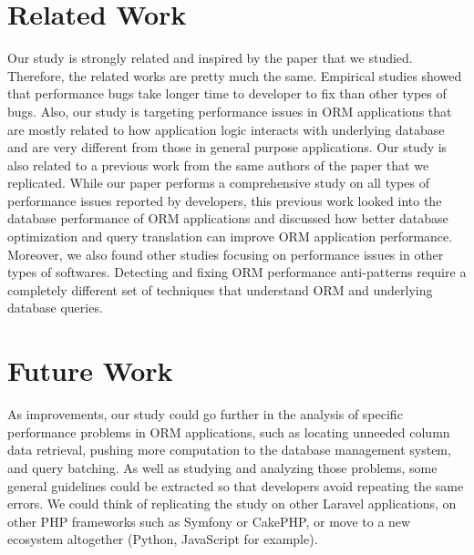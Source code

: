 \documentclass[sigconf]{acmart}
\begin{document}
\section{Related Work}
Our study is strongly related and inspired by the paper \cite{paper} that we studied. Therefore, the related works are pretty much the same. Empirical studies showed that performance bugs take longer time to developer to fix than other types of bugs. Also, our study is targeting performance issues in ORM applications that are mostly related to how application logic interacts with underlying database and are very different from those in general purpose applications. Our study is also related to a previous work \cite{paperInefficiencies} from the same authors of the paper that we replicated. While our paper performs a comprehensive study on all types of performance issues reported by developers, this previous work looked into the database performance of ORM applications and discussed how better database optimization and query translation can improve ORM application performance. Moreover, we also found other studies \cite{paperTechniques,paperBugs} focusing on performance issues in other types of softwares. Detecting and fixing ORM performance anti-patterns require a completely different set of
techniques that understand ORM and underlying database queries.

\section{Future Work}
As improvements, our study could go further in the analysis of specific performance problems in ORM applications, such as
locating unneeded column data retrieval, pushing more computation to the database management system, and query batching. As well as studying and analyzing those problems, some general guidelines could be extracted so that developers avoid repeating the same errors. We could think of replicating the study on other Laravel applications, on other PHP frameworks such as Symfony or CakePHP, or move to a new ecosystem altogether (Python, JavaScript for example).
\end{document}
